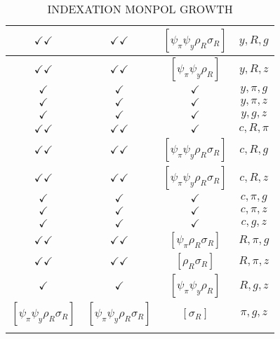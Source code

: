 \documentclass[a4paper,10pt]{article}
\begin{document}
\begin{longtable}{|c|c|c|c|}
\hline
$\checkmark\checkmark$ & $\checkmark\checkmark$ & $[\psi_\pi \psi_y \rho_R \sigma_R ]$ & ${y},{R},{g}$ \\
\hline
$\checkmark\checkmark$ & $\checkmark\checkmark$ & $[\psi_\pi \psi_y \rho_R ]$ & ${y},{R},{z}$ \\
\hline
$\checkmark$ & $\checkmark$ & $\checkmark$ & ${y},{\pi},{g}$ \\
\hline
$\checkmark$ & $\checkmark$ & $\checkmark$ & ${y},{\pi},{z}$ \\
\hline
$\checkmark$ & $\checkmark$ & $\checkmark$ & ${y},{g},{z}$ \\
\hline
$\checkmark\checkmark$ & $\checkmark\checkmark$ & $\checkmark$ & ${c},{R},{\pi}$ \\
\hline
$\checkmark\checkmark$ & $\checkmark\checkmark$ & $[\psi_\pi \psi_y \rho_R \sigma_R ]$ & ${c},{R},{g}$ \\
\hline
$\checkmark\checkmark$ & $\checkmark\checkmark$ & $[\psi_\pi \psi_y \rho_R \sigma_R ]$ & ${c},{R},{z}$ \\
\hline
$\checkmark$ & $\checkmark$ & $\checkmark$ & ${c},{\pi},{g}$ \\
\hline
$\checkmark$ & $\checkmark$ & $\checkmark$ & ${c},{\pi},{z}$ \\
\hline
$\checkmark$ & $\checkmark$ & $\checkmark$ & ${c},{g},{z}$ \\
\hline
$\checkmark\checkmark$ & $\checkmark\checkmark$ & $[\psi_\pi \rho_R \sigma_R ]$ & ${R},{\pi},{g}$ \\
\hline
$\checkmark\checkmark$ & $\checkmark\checkmark$ & $[\rho_R \sigma_R ]$ & ${R},{\pi},{z}$ \\
\hline
$\checkmark$ & $\checkmark$ & $[\psi_\pi \psi_y \rho_R ]$ & ${R},{g},{z}$ \\
\hline
$[\psi_\pi \psi_y \rho_R \sigma_R ]$ & $[\psi_\pi \psi_y \rho_R \sigma_R ]$ & $[\sigma_R ]$ & ${\pi},{g},{z}$ \\
\hline
\caption{INDEXATION MONPOL GROWTH}
\label{table:MyTableLabel}
\end{longtable}
\end{document}
